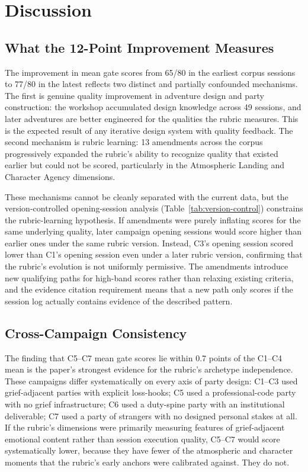 
\section{Discussion}
\label{sec:discussion}

\subsection{What the 12-Point Improvement Measures}

The improvement in mean gate scores from 65/80 in the earliest corpus sessions to
77/80 in the latest reflects two distinct and partially confounded mechanisms. The
first is genuine quality improvement in adventure design and party construction: the
workshop accumulated design knowledge across 49 sessions, and later adventures are
better engineered for the qualities the rubric measures. This is the expected result
of any iterative design system with quality feedback. The second mechanism is rubric
learning: 13 amendments across the corpus progressively expanded the rubric's ability
to recognize quality that existed earlier but could not be scored, particularly in the
Atmospheric Landing and Character Agency dimensions.

These mechanisms cannot be cleanly separated with the current data, but the version-controlled
opening-session analysis (Table~\ref{tab:version-control}) constrains the rubric-learning
hypothesis. If amendments were purely inflating scores for the same underlying quality,
later campaign opening sessions would score higher than earlier ones under the same
rubric version. Instead, C3's opening session scored lower than C1's opening session
even under a later rubric version, confirming that the rubric's evolution is not
uniformly permissive. The amendments introduce new qualifying paths for high-band
scores rather than relaxing existing criteria, and the evidence citation requirement
means that a new path only scores if the session log actually contains evidence of the
described pattern.

\subsection{Cross-Campaign Consistency}

The finding that C5--C7 mean gate scores lie within 0.7 points of the C1--C4 mean is
the paper's strongest evidence for the rubric's archetype independence. These campaigns
differ systematically on every axis of party design: C1--C3 used grief-adjacent parties
with explicit loss-hooks; C5 used a professional-code party with no grief infrastructure;
C6 used a duty-spine party with an institutional deliverable; C7 used a party of
strangers with no designed personal stakes at all. If the rubric's dimensions were
primarily measuring features of grief-adjacent emotional content rather than session
execution quality, C5--C7 would score systematically lower, because they have fewer of
the atmospheric and character moments that the rubric's early anchors were calibrated
against. They do not.

